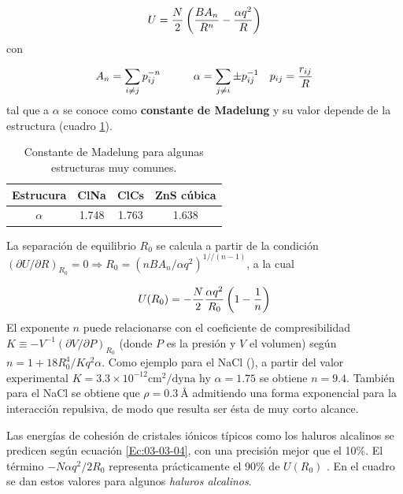 \begin{equation}
    U = \frac{N}{2} \left( \frac{BA_n}{R^n}-\frac{\alpha q^2}{R} \right)
\end{equation}
con 

\begin{equation}
    A_n = \sum_{i\neq j} p_{ij}^{-n} \quad \quad \quad \alpha = \sum_{j \neq i} \pm p_{ij}^{-1} \quad p_{ij} = \frac{r_{ij}}{R}
\end{equation}
tal que a $\alpha$ se conoce como \textbf{constante de Madelung} y su valor depende de la estructura (cuadro \ref{Tab:03-02}).

\begin{table}[h!] \centering
    \begin{tabular}{c|ccc}
        Estrucura & ClNa & ClCs & ZnS cúbica \\ \hline
        $\alpha$ & 1.748 & 1.763 & 1.638 
    \end{tabular}
    \caption{Constante de Madelung para algunas estructuras muy comunes.}
    \label{Tab:03-02}
\end{table}

La separación de equilibrio $R_0$ se calcula a partir  de la condición $(\partial U / \partial R)_{R_0} = 0 \Rightarrow R_0 = (nBA_n/\alpha q^2)^{1//(n-1)}$, a la cual

\begin{equation}
U(R_0) = - \frac{N}{2} \frac{\alpha q^2}{R_0} \left( 1-\frac{1}{n} \right) \label{Ec:03-03-04}
\end{equation}
El exponente $n$ puede relacionarse con el coeficiente de compresibilidad $K\equiv - V^{-1}(\partial V / \partial P)_{R_0}$ (donde $P$ es la presión y $V$ el volumen) según $n=1+18R_0^4 / Kq^2 \alpha$. Como ejemplo para el NaCl (\fcc), a partir del valor experimental $K=3.3\times 10^{-12} \unit{\cm}^2 / \text{dyna}$ hy $\alpha = 1.75$ se obtiene $n=9.4$. También para el NaCl se obtiene que $\rho=0.3 \ \unit{\angstrom}$ admitiendo una forma exponencial para la interacción repulsiva, de modo que resulta ser ésta de muy corto alcance.

Las energías de cohesión de cristales iónicos típicos como los haluros alcalinos se predicen según ecuación \ref{Ec:03-03-04}, con una precisión mejor que el 10\%. El término $-N\alpha q^2 / 2 R_0$ representa prácticamente el 90\% de $U(R_0)$ . En el cuadro se dan estos valores para  algunos \textit{haluros alcalinos}.

